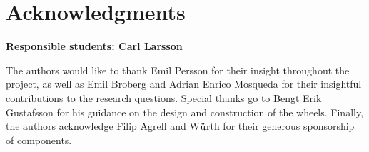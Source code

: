\section*{Acknowledgments}


\textbf{Responsible students: Carl Larsson}


The authors would like to thank Emil Persson for their insight throughout the project, as well as  Emil Broberg and Adrian Enrico Mosqueda for their insightful contributions to the research questions.
Special thanks go to Bengt Erik Gustafsson for his guidance on the design and construction of the wheels. 
Finally, the authors acknowledge Filip Agrell and W$\Ddot{\text{u}}$rth for their generous sponsorship of components.

